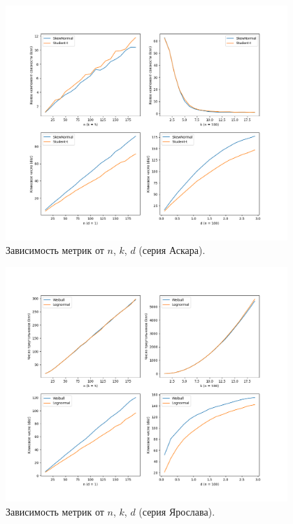 \documentclass[a4paper,12pt]{article}
\begin{document}
\begin{figure}[H]
    \centering
    \includegraphics[width=0.95\textwidth]{Graphics/part2_results_Askar.png}
    \caption{Зависимость метрик от $n$, $k$, $d$ (серия Аскара).}
    \label{fig:part2-askar}
\end{figure}

\begin{figure}[H]
    \centering
    \includegraphics[width=0.95\textwidth]{Graphics/part2_results_Yaroslav.png}
    \caption{Зависимость метрик от $n$, $k$, $d$ (серия Ярослава).}
    \label{fig:part2-yaroslav}
\end{figure}
\end{document}
